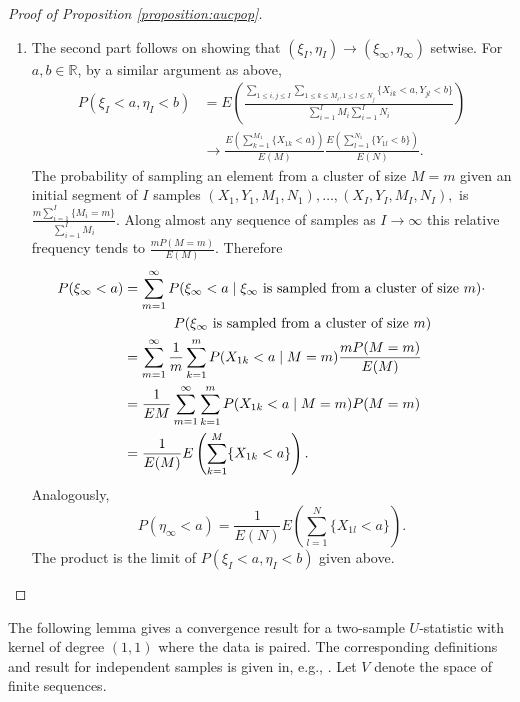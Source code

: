 \documentclass[12pt]{article}
\newcommand{\I}{I}
\newcommand{\E}{E}
\renewcommand{\P}{P}
\newcommand{\seqspace}{V}%
\newcommand{\comment}[1]{
  \iftoggle{commenttoggle}{
    {\normalsize{\color{red}{ #1}}\normalsize}
  }
  {}
}
\begin{document}
\begin{proof}[Proof of Proposition \ref{proposition:aucpop}]
\begin{enumerate}
    \item The second part follows on showing that $(\xi_\I,\eta_\I)\to (\xi_\infty,\eta_\infty)$ setwise. %
      For $a,b\in\mathbb{R}$, by a similar argument as above,
      \begin{align}
        \P(\xi_\I<a,\eta_\I<b) &=\E\left(\frac
                                     {\sum_{1\le i,j\le\I}\sum_{1\le k\le M_i,1\le l\le N_j}\{X_{ik}<a,Y_{jl}<b\}}
                                 {\sum_{i=1}^\I M_i \sum_{i=1}^\I N_i} \right)\\
                               &\to \frac{\E\left(\sum_{k=1}^{M_1}\{X_{1k}<a\}\right)}{\E (M)}
                                 \frac{\E\left(\sum_{l=1}^{N_1}\{Y_{1l}<b\}\right)}{\E (N)}.
      \end{align}
      The probability of sampling an element from a cluster of size
      $M=m$ given an initial segment of $\I$ samples
      $(X_1,Y_1,M_1,N_1),\ldots,(X_\I,Y_\I,M_\I,N_\I),$ is
      $\frac{m\sum_{i=1}^\I\{M_i=m\}}{\sum_{i=1}^\I M_i}$. Along almost
      any sequence of samples as $\I\to\infty$ this relative frequency
      tends to $\frac{m\P(M=m)}{\E (M)}$. Therefore
      \begin{align}
        \P(\xi_\infty < a) &= \sum_{m=1}^\infty\P(\xi_\infty < a \mid \xi_\infty\text{ is sampled from a cluster of size }m)\cdot\\
        &\hspace{.5in}\P(\xi_\infty\text{ is sampled from a cluster of size }m)\\
                           &= \sum_{m=1}^\infty\frac{1}{m}\sum_{k=1}^m\P(X_{1k}<a\mid M=m)\frac{m\P(M=m)}{\E (M)}\\
                           &=\frac{1}{\E M}\sum_{m=1}^\infty\sum_{k=1}^m\P(X_{1k}<a\mid M=m)\P(M=m)\\
        &=\frac{1}{\E (M)}\E\left(\sum_{k=1}^M\{X_{1k}<a\}\right).
      \end{align}
      Analogously,
      $$
      \P(\eta_\infty < a)=\frac{1}{\E (N)}\E\left(\sum_{l=1}^N\{X_{1l}<a\}\right).
      $$
      The product is the limit of
      $\P(\xi_\I<a,\eta_\I<b)$ given above.
    \end{enumerate}
  \end{proof}
    The following lemma gives a convergence result for a two-sample $U$-statistic with kernel of degree $(1,1)$ where the data is paired. The corresponding definitions and result for independent samples is given in, e.g., \citet{lee2019}. Let $\seqspace$ denote the space of finite sequences.%
\end{document}
